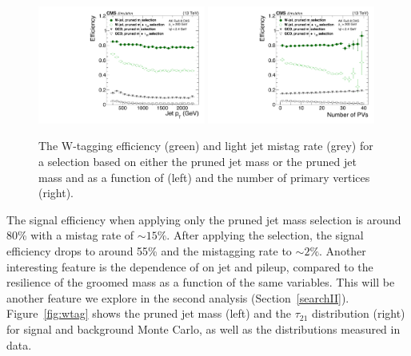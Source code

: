 \begin{figure}[h]
\begin{center}
\includegraphics[width=0.49\textwidth]{figures/analysis/search1/misc/WtagSigEff_vpT_pruned.pdf}
\includegraphics[width=0.49\textwidth]{figures/analysis/search1/misc/WtagSigEff_vnPVs_pruned.pdf}
\caption{The W-tagging efficiency (green) and light jet mistag rate (grey) for a selection based on either the pruned jet mass or the pruned jet mass and \nsubj as a function of \PT (left) and the number of primary vertices (right).}
\label{fig:searchI:wtageff}
\end{center}
\end{figure}
The signal efficiency when applying only the pruned jet mass selection is around 80\% with a mistag rate of $\sim 15\%$. After applying the \nsubj selection, the signal efficiency drops to around 55\% and the mistagging rate to $\sim 2\%$. Another interesting feature is the dependence of \nsubj on jet \PT and pileup, compared to the resilience of the groomed mass as a function of the same variables. This will be another feature we explore in the second analysis (Section~\ref{searchII}). Figure~\ref{fig:wtag} shows the pruned jet mass (left) and the $\tau_{21}$ distribution (right) for signal and background Monte Carlo, as well as the distributions measured in data. 
